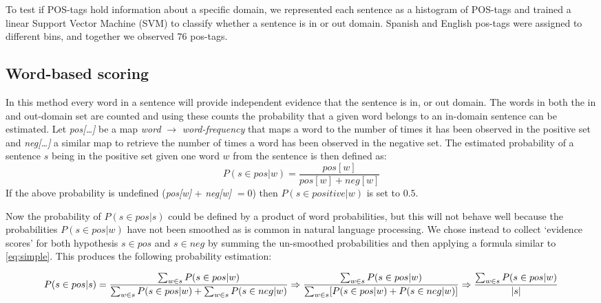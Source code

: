 \documentclass[11pt]{article}
\begin{document}
To test if POS-tags hold information about a specific domain, we represented each sentence as a histogram of POS-tags and trained a linear Support Vector Machine (SVM) to classify whether a sentence is in or out domain. Spanish and English pos-tags were assigned to different bins, and together we observed $76$ pos-tags.

\subsection{Word-based scoring}
\label{wbs}
In this method every word in a sentence will provide independent evidence that the sentence is in, or out domain. The words in both the in and out-domain set are counted and using these counts the probability that a given word belongs to an in-domain sentence can be estimated. Let \textit{pos[\dots]} be a map \textit{word} $\rightarrow$ \textit{word-frequency} that maps a word to the number of times it has been observed in the positive set and \textit{neg[\dots]} a similar map to retrieve the number of times a word has been observed in the negative set.
The estimated probability of a sentence $s$ being in the positive set given one word $w$ from the sentence is then defined as:
\begin{equation} \label{eq:simple} P(s\in pos | w) = \frac{pos[w]}{pos[w] + neg[w]} \end{equation}
If the above probability is undefined (\textit{pos[w]} + \textit{neg[w]} $= 0$) then $P(s\in positive | w)$ is set to $0.5$.

Now the probability of $P(s\in pos | s)$ could be defined by a product of word probabilities, but this will not behave well because the probabilities $P(s\in pos | w)$ have not been smoothed as is common in natural language processing. We chose instead to collect `evidence scores' for both hypothesis $s\in pos$ and $s\in neg$ by summing the un-smoothed probabilities and then applying a formula similar to \ref{eq:simple}. This produces the following probability estimation:

\begin{dmath} 
P(s\in pos | s)  = \\\\ 
\frac{\sum_{w\in s} P(s\in pos | w)}{\sum_{w\in s} P(s\in pos | w) + \sum_{w\in s} P(s\in neg | w)} \Rightarrow \\\\\\  
\frac{\sum_{w\in s} P(s\in pos | w)}{\sum_{w\in s} [ P(s\in pos | w) + P(s\in neg | w) ]} \Rightarrow \\\\\\ 
\frac{\sum_{w\in s} P(s\in pos | w)}{ | s | } 
\end{dmath}
\end{document}
